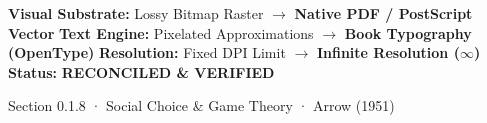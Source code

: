 \documentclass[10pt,a4paper,landscape]{article}
\begin{document}
\vspace*{0.05cm}
\noindent
\begin{tcolorbox}[
  colback=hhpaper,colframe=hhgray!35,arc=1.5pt,boxrule=0.4pt,
  top=1.5pt,bottom=1.5pt,left=6pt,right=6pt
]
  \pdgrotesk\scriptsize
  \noindent
  \textbf{Visual Substrate:} Lossy Bitmap Raster $\rightarrow$ \textbf{\color{pdcobalt}Native PDF / PostScript Vector}\hfill
  \textbf{Text Engine:} Pixelated Approximations $\rightarrow$ \textbf{\color{pdcobalt}Book Typography (OpenType)}\hfill
  \textbf{Resolution:} Fixed DPI Limit $\rightarrow$ \textbf{\color{pdcobalt}Infinite Resolution ($\infty$)}\hfill
  \textbf{Status:} \textbf{\color{pdteal}RECONCILED \& VERIFIED}
\end{tcolorbox}
\clearpage

\noindent
\begin{minipage}[t]{\linewidth}
  \hfill
  {\pdgrotesk\footnotesize\color{hhgray} Section 0.1.8 · Social Choice \& Game Theory · Arrow (1951)}\\
  \vspace*{0.03cm}
  \noindent{\color{hhgray!40}\rule{\linewidth}{0.5pt}}
\end{minipage}
\end{document}
